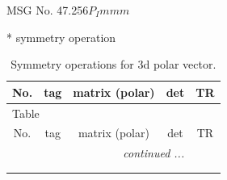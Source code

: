 \documentclass[fleqn,8pt]{jsarticle}
\begin{document}
\setcounter{MaxMatrixCols}{32}

\renewcommand{\tablename}{Table~}
\renewcommand{\figurename}{Figure~}
\begin{center}
\LARGE
MSG No. 47.256\quad$P_{I}mmm$
\end{center}
* symmetry operation
\renewcommand{\arraystretch}{1.3}
\begin{longtable}{ccccc}
\caption{Symmetry operations for 3d polar vector.}
 \\
 \hline \hline
No. & tag & matrix (polar) & det & TR \\ \hline \endfirsthead

\multicolumn{4}{l}{\tablename\ \thetable{}} \\
 \hline \hline
No. & tag & matrix (polar) & det & TR \\ \hline \endhead

 \hline \hline
\multicolumn{4}{r}{\footnotesize\it continued ...} \\ \endfoot

 \hline \hline
\multicolumn{4}{r}{} \\ \endlastfoot


\end{longtable}
\end{document}

